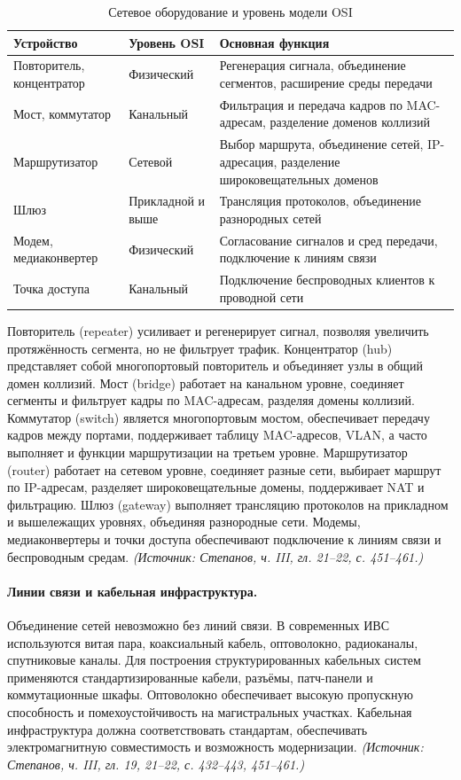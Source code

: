 \documentclass[a4paper,12pt]{article}
\begin{document}
\begin{table}[h]
\centering
\caption{Сетевое оборудование и уровень модели OSI}
\label{tab:devices}
\begin{tabular}{p{3.2cm}p{2.8cm}p{7.5cm}}
\toprule
\textbf{Устройство} & \textbf{Уровень OSI} & \textbf{Основная функция} \\
\midrule
Повторитель, концентратор & Физический & Регенерация сигнала, объединение сегментов, расширение среды передачи \\
Мост, коммутатор & Канальный & Фильтрация и передача кадров по MAC-адресам, разделение доменов коллизий \\
Маршрутизатор & Сетевой & Выбор маршрута, объединение сетей, IP-адресация, разделение широковещательных доменов \\
Шлюз & Прикладной и выше & Трансляция протоколов, объединение разнородных сетей \\
Модем, медиаконвертер & Физический & Согласование сигналов и сред передачи, подключение к линиям связи \\
Точка доступа & Канальный & Подключение беспроводных клиентов к проводной сети \\
\bottomrule
\end{tabular}
\end{table}

Повторитель (repeater) усиливает и регенерирует сигнал, позволяя увеличить протяжённость сегмента, но не фильтрует трафик. Концентратор (hub) представляет собой многопортовый повторитель и объединяет узлы в общий домен коллизий. Мост (bridge) работает на канальном уровне, соединяет сегменты и фильтрует кадры по MAC-адресам, разделяя домены коллизий. Коммутатор (switch) является многопортовым мостом, обеспечивает передачу кадров между портами, поддерживает таблицу MAC-адресов, VLAN, а часто выполняет и функции маршрутизации на третьем уровне. Маршрутизатор (router) работает на сетевом уровне, соединяет разные сети, выбирает маршрут по IP-адресам, разделяет широковещательные домены, поддерживает NAT и фильтрацию. Шлюз (gateway) выполняет трансляцию протоколов на прикладном и вышележащих уровнях, объединяя разнородные сети. Модемы, медиаконвертеры и точки доступа обеспечивают подключение к линиям связи и беспроводным средам.
\textit{(Источник: Степанов, ч. III, гл. 21–22, с. 451–461.)}

\paragraph{Линии связи и кабельная инфраструктура.}
Объединение сетей невозможно без линий связи. В современных ИВС используются витая пара, коаксиальный кабель, оптоволокно, радиоканалы, спутниковые каналы. Для построения структурированных кабельных систем применяются стандартизированные кабели, разъёмы, патч-панели и коммутационные шкафы. Оптоволокно обеспечивает высокую пропускную способность и помехоустойчивость на магистральных участках. Кабельная инфраструктура должна соответствовать стандартам, обеспечивать электромагнитную совместимость и возможность модернизации.
\textit{(Источник: Степанов, ч. III, гл. 19, 21–22, с. 432–443, 451–461.)}
\end{document}
